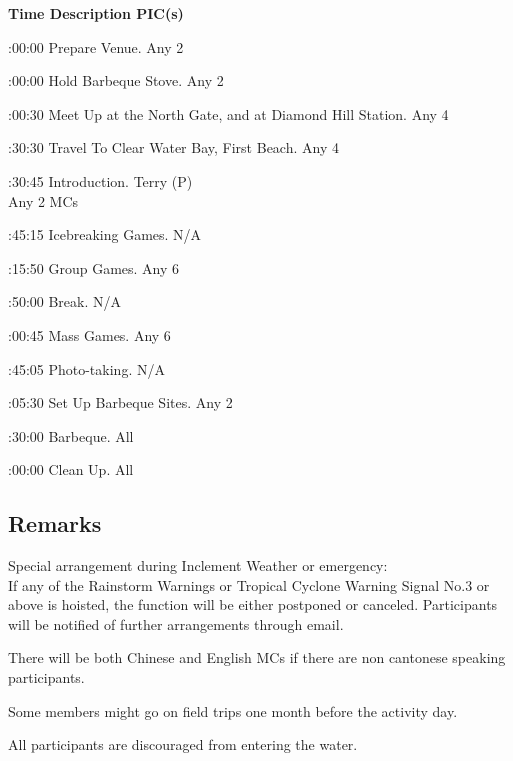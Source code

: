 \setupTABLE[c][1][width=1.25in]
\setupTABLE[c][2][width=3.5in]
\setupTABLE[c][3][width=1.25in]
\bTABLE[split=no]
\bTABLEhead

\bTR\bTH    \bf{Time}
\eTH\bTH    \bf{Description}
\eTH\bTH    \bf{PIC(s)}
\eTH\eTR

\eTABLEhead
\bTABLEbody

\bTR{}:00:00
\eTD\bTD Prepare Venue.
\eTD\bTD Any 2
\eTD\eTR

\bTR{}:00:00
\eTD\bTD Hold Barbeque Stove.
\eTD\bTD Any 2
\eTD\eTR

\bTR{}:00:30
\eTD\bTD Meet Up at the North Gate, and at Diamond Hill Station.
\eTD\bTD Any 4
\eTD\eTR

\bTR{}:30:30
\eTD\bTD Travel To Clear Water Bay, First Beach.
\eTD\bTD Any 4
\eTD\eTR

\bTR{}:30:45
\eTD\bTD Introduction.
\eTD\bTD Terry (P) \\ Any 2 MCs
\eTD\eTR

\bTR{}:45:15
\eTD\bTD Icebreaking Games.
\eTD\bTD N/A
\eTD\eTR

\bTR{}:15:50
\eTD\bTD Group Games.
\eTD\bTD Any 6
\eTD\eTR

\bTR{}:50:00
\eTD\bTD Break.
\eTD\bTD N/A
\eTD\eTR

\bTR{}:00:45
\eTD\bTD Mass Games.
\eTD\bTD Any 6
\eTD\eTR

\bTR{}:45:05
\eTD\bTD Photo-taking.
\eTD\bTD N/A
\eTD\eTR

\bTR{}:05:30
\eTD\bTD Set Up Barbeque Sites.
\eTD\bTD Any 2
\eTD\eTR

\bTR{}:30:00
\eTD\bTD Barbeque.
\eTD\bTD All
\eTD\eTR

\bTR{}:00:00
\eTD\bTD Clean Up.
\eTD\bTD All
\eTD\eTR

\eTABLEbody
\eTABLE

\subsection{Remarks}
\startitemize
\item Special arrangement during Inclement Weather or emergency: \\
If any of the Rainstorm Warnings or Tropical Cyclone Warning Signal No.3 or above is hoisted, the function will be either postponed or canceled. Participants will be notified of further arrangements through email.
\item There will be both Chinese and English MCs if there are non cantonese speaking participants.
\item Some members might go on field trips one month before the activity day.
\item All participants are discouraged from entering the water.
\stopitemize

\pagebreak
